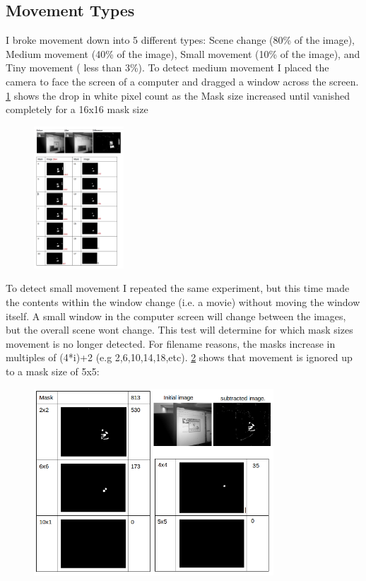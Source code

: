 \documentclass[11pt]{article} %
\begin{document}
\subsection{Movement Types}
I broke movement down into 5 different types:  Scene change (80\% of the image), Medium movement (40\% of the image), Small movement (10\% of the image), and Tiny movement ( less than 3\%).
To detect medium movement I placed the camera to face the screen of a computer and dragged a window across the screen. \cref{img:medium} shows the drop in white pixel count as the Mask size increased until vanished completely for a 16x16 mask size
\begin{figure}
	\begin{center}
		\includegraphics[width=0.3\textwidth]{../images/ImageOps/LARGE}
		\label{img:medium}
	\end{center}
\end{figure}

To detect small movement I repeated the same experiment, but this time made the contents within the window change (i.e. a movie) without moving the window itself.  A small window in the computer screen will change between the images, but the overall scene wont change. This test will determine for which mask sizes movement is no longer detected.
For filename reasons, the masks increase in multiples of (4*i)+2  (e.g 2,6,10,14,18,etc). \cref{img:small} shows that movement is ignored up to a mask size of 5x5:
\begin{figure}
	\vspace{-20pt}
	\begin{center}
		\includegraphics[width=0.8\textwidth]{../images/ImageOps/SMALL}
	\end{center}
	\caption{}
	\label{img:small}
\end{figure}
\end{document}
